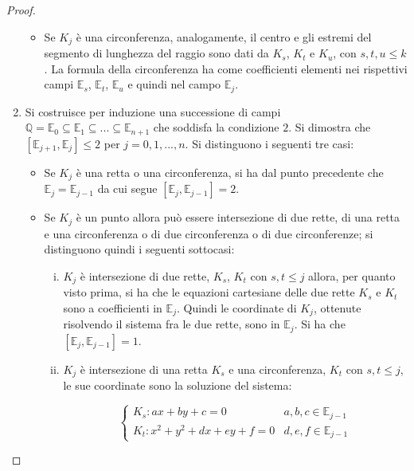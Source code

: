 \begin{proof}
\begin{enumerate}
\begin{itemize}
\item Se $K_{j}$ è una circonferenza, analogamente, il centro e gli estremi del segmento di lunghezza del raggio sono dati da $K_{s}$, $K_{t}$ e $K_{u}$, con $s,t,u \leq k$. La formula della circonferenza ha come coefficienti elementi nei rispettivi campi $\mathbb{E}_s$, $\mathbb{E}_t$, $\mathbb{E}_u$ e quindi nel campo $\mathbb{E}_j$.

\end{itemize}

\item Si costruisce per induzione una successione di campi $\mathbb{Q} = \mathbb{E}_0 \subseteq \mathbb{E}_1 \subseteq ... \subseteq  \mathbb{E}_{n+1}$ che soddisfa la condizione $2$. Si dimostra che  $[\mathbb{E}_{j+1}, \mathbb{E}_{j}] \leq 2 $ per $j = 0, 1, ... , n$.
Si distinguono i seguenti tre casi:

\begin{itemize}

\item Se $K_{j}$ è una retta o una circonferenza, si ha dal punto precedente che $\mathbb{E}_{j}=\mathbb{E}_{j-1}$ da cui segue $[\mathbb{E}_{j}, \mathbb{E}_{j-1}] = 2$.

\item Se $K_{j}$ è un punto allora può essere intersezione di due rette, di una retta e una circonferenza o di due circonferenza o di due circonferenze; si distinguono quindi i seguenti sottocasi:

\begin{enumerate} [i)]

 \item  $K_{j}$ è intersezione di due rette, $K_{s}$, $K_{t}$ con $s,t \leq j$ allora, per quanto visto prima, si ha che le equazioni cartesiane delle due rette $K_{s}$ e $K_{t}$ sono a coefficienti in $\mathbb{E}_{j}$. Quindi le coordinate di $K_{j}$, ottenute risolvendo il sistema fra le due rette, sono in $\mathbb{E}_{j}$. Si ha che $[\mathbb{E}_{j}, \mathbb{E}_{j-1}] = 1$.

\item  $K_{j}$ è intersezione di una retta $K_{s}$ e una circonferenza, $K_{t}$ con $s,t \leq j$, le sue coordinate sono la soluzione del sistema:

\begin{displaymath}
 \left\{ \begin{array}{ll}
 K_{s}: ax + by + c = 0                             &     a,b,c \in \mathbb{E}_{j-1} \\
 K_{t}: x^2 + y^2 +dx + ey + f = 0           &     d,e,f \in \mathbb{E}_{j-1}
 \end{array} \right.
 \end{displaymath}
 

\end{enumerate}
\end{itemize}
\end{enumerate}
\end{proof}
